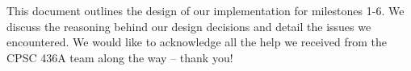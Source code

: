This document outlines the design of our implementation for milestones 1-6. We discuss the reasoning behind our design decisions and detail the issues we encountered. We would like to acknowledge all the help we received from the CPSC 436A team along the way -- thank you! 
